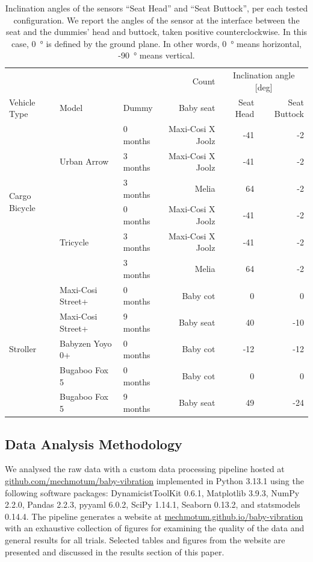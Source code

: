 \documentclass[a4paper]{article}
\begin{document}
\begin{table}
  \centering
  \caption{Inclination angles of the sensors ``Seat Head'' and ``Seat Buttock'',
  per each tested configuration. We report the angles of the sensor at the
  interface between the seat and the dummies' head and buttock, taken positive
  counterclockwise. In this case, 0~\si{\degree} is defined by the ground plane.
  In other words, 0~\si{\degree} means horizontal, -90~\si{\degree} means
  vertical.}
\begin{tabular}{lllrrr}
\toprule
 &  &  & Count & \multicolumn{2}{c}{Inclination angle [deg]}  \\
Vehicle Type & Model & Dummy & Baby seat & Seat Head & Seat Buttock\\
\midrule
\multirow[t]{6}{*}{Cargo Bicycle} & \multirow[t]{3}{*}{Urban Arrow} & 0 months & Maxi-Cosi X Joolz & -41 & -2 \\
 &  & 3 months & Maxi-Cosi X Joolz & -41 & -2 \\
 &  & 3 months & Melia & 64 & -2 \\
\cline{2-6}
 & \multirow[t]{3}{*}{Tricycle} & 0 months & Maxi-Cosi X Joolz & -41 & -2 \\
 &  & 3 months & Maxi-Cosi X Joolz & -41 & -2 \\
 &  & 3 months & Melia & 64 & -2 \\
\cline{1-6} \cline{2-6}
\multirow[t]{5}{*}{Stroller} & Maxi-Cosi Street+ & 0 months & Baby cot & 0 & 0\\
\cline{2-6}
 & Maxi-Cosi Street+ & 9 months & Baby seat & 40 & -10 \\
\cline{2-6}
 & Babyzen Yoyo 0+ & 0 months & Baby cot & -12 & -12 \\
\cline{2-6}
 & Bugaboo Fox 5 & 0 months & Baby cot & 0 & 0 \\
\cline{2-6}
 & Bugaboo Fox 5 & 9 months & Baby seat & 49 & -24\\
\bottomrule
\end{tabular}
  \label{tab:baby-posture}
\end{table}

\subsection{Data Analysis Methodology}
% 
We analysed the raw data with a custom data processing pipeline hosted at
\href{https://github.com/mechmotum/baby-vibration}{github.com/mechmotum/baby-vibration}
implemented in Python 3.13.1 using the following software packages:
DynamicistToolKit 0.6.1, Matplotlib 3.9.3, NumPy 2.2.0, Pandas 2.2.3, pyyaml
6.0.2, SciPy 1.14.1, Seaborn 0.13.2, and statsmodels 0.14.4. The pipeline
generates a website at
\href{https://mechmotum.github.io/baby-vibration}{mechmotum.github.io/baby-vibration}
with an exhaustive collection of figures for examining the quality of the data
and general results for all trials. Selected tables and figures from the website
are presented and discussed in the results section of this paper.
\end{document}
